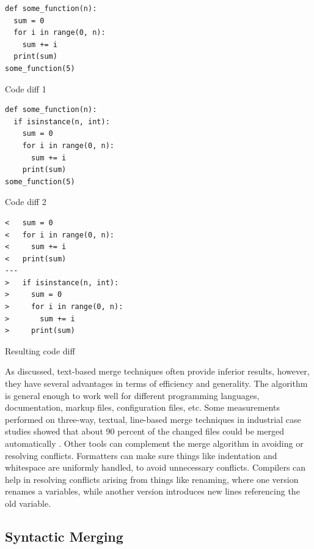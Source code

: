 \documentclass[a4paper,english]{ifimaster}
\begin{document}
\begin{listing}
	\begin{verbatim}
def some_function(n):
  sum = 0
  for i in range(0, n):
    sum += i
  print(sum)
some_function(5)

  \end{verbatim}
	\caption{Code diff 1}
	\label{lst:code_diff_1}
\end{listing}

\begin{listing}
	\begin{verbatim}
def some_function(n):
  if isinstance(n, int):
    sum = 0
    for i in range(0, n):
      sum += i
    print(sum)
some_function(5)
  \end{verbatim}
	\caption{Code diff 2}
	\label{lst:code_diff_2}
\end{listing}

\begin{listing}
	\begin{verbatim}
<   sum = 0
<   for i in range(0, n):
<     sum += i
<   print(sum)
---
>   if isinstance(n, int):
>     sum = 0
>     for i in range(0, n):
>       sum += i
>     print(sum)
  \end{verbatim}
	\caption{Resulting code diff}
	\label{lst:result_code_diff}
\end{listing}

As discussed, text-based merge techniques often provide inferior results, however, they have several advantages in terms of efficiency and generality. The algorithm is general enough to work well for different programming languages, documentation, markup files, configuration files, etc. Some measurements performed on three-way, textual, line-based merge techniques in industrial case studies showed that about 90 percent of the changed files could be merged automatically \cite{cite:large_scale_case_study}. Other tools can complement the merge algorithm in avoiding or resolving conflicts. Formatters can make sure things like indentation and whitespace are uniformly handled, to avoid unnecessary conflicts. Compilers can help in resolving conflicts arising from things like renaming, where one version renames a variables, while another version introduces new lines referencing the old variable.

\subsection{Syntactic Merging}%
\label{sub:syntactic_merging}
\end{document}
